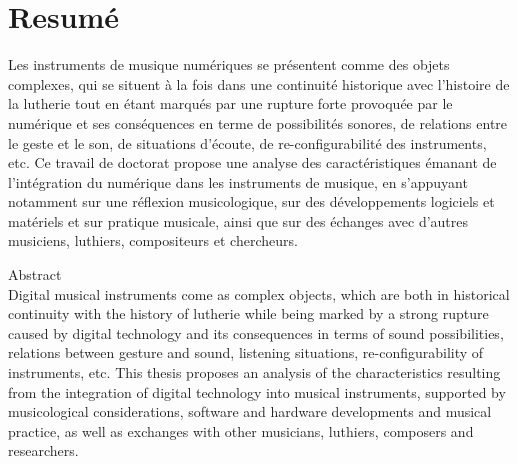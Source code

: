 %
\chapter*{Resumé}
\label{sec:abstract}
\vspace*{-10mm}

\noindent Les instruments de musique numériques se présentent comme des objets complexes, qui se situent à la fois dans une continuité historique avec l'histoire de la lutherie tout en étant marqués par une rupture forte provoquée par le numérique et ses conséquences en terme de possibilités sonores, de relations entre le geste et le son, de situations d'écoute, de re-configurabilité des instruments, etc. Ce travail de doctorat propose une analyse des caractéristiques émanant de l'intégration du numérique dans les instruments de musique, en s'appuyant notamment sur une réflexion musicologique, sur des développements logiciels et matériels et sur pratique musicale, ainsi que sur des échanges avec d'autres musiciens, luthiers, compositeurs et chercheurs.

\vspace*{20mm}

{Abstract}\label{sec:abstract-diff} \\

\noindent Digital musical instruments come as complex objects, which are both in historical continuity with the history of lutherie while being marked by a strong rupture caused by digital technology and its consequences in terms of sound possibilities, relations between gesture and sound, listening situations, re-configurability of instruments, etc. This thesis proposes an analysis of the characteristics resulting from the integration of digital technology into musical instruments, supported by musicological considerations, software and hardware developments and musical practice, as well as exchanges with other musicians, luthiers, composers and researchers.